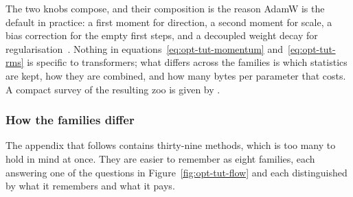 The two knobs compose, and their composition is the reason AdamW is the
default in practice: a first moment for direction, a second moment for scale,
a bias correction for the empty first steps, and a decoupled weight decay for
regularisation~\citep{kingma_adam_2014}. Nothing in
equations~\eqref{eq:opt-tut-momentum} and~\eqref{eq:opt-tut-rms} is specific to
transformers; what differs across the families is which statistics are kept,
how they are combined, and how many bytes per parameter that costs. A compact
survey of the resulting zoo is given by \citet{ruder_2016}.

\subsubsection{How the families differ}
\label{sec:opt-tutorial-families}

The appendix that follows contains thirty-nine methods, which is too many to
hold in mind at once. They are easier to remember as eight families, each
answering one of the questions in Figure~\ref{fig:opt-tut-flow} and each
distinguished by what it remembers and what it pays.

